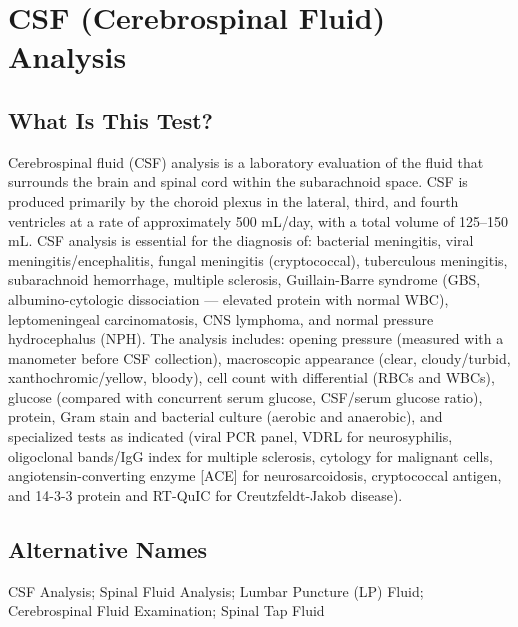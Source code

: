 \chapter{CSF (Cerebrospinal Fluid) Analysis}
\section*{What Is This Test?}
Cerebrospinal fluid (CSF) analysis is a laboratory evaluation of the fluid that surrounds the brain and spinal cord within the subarachnoid space. CSF is produced primarily by the choroid plexus in the lateral, third, and fourth ventricles at a rate of approximately 500 mL/day, with a total volume of 125--150 mL. CSF analysis is essential for the diagnosis of: bacterial meningitis, viral meningitis/encephalitis, fungal meningitis (cryptococcal), tuberculous meningitis, subarachnoid hemorrhage, multiple sclerosis, Guillain-Barre syndrome (GBS, albumino-cytologic dissociation --- elevated protein with normal WBC), leptomeningeal carcinomatosis, CNS lymphoma, and normal pressure hydrocephalus (NPH). The analysis includes: opening pressure (measured with a manometer before CSF collection), macroscopic appearance (clear, cloudy/turbid, xanthochromic/yellow, bloody), cell count with differential (RBCs and WBCs), glucose (compared with concurrent serum glucose, CSF/serum glucose ratio), protein, Gram stain and bacterial culture (aerobic and anaerobic), and specialized tests as indicated (viral PCR panel, VDRL for neurosyphilis, oligoclonal bands/IgG index for multiple sclerosis, cytology for malignant cells, angiotensin-converting enzyme [ACE] for neurosarcoidosis, cryptococcal antigen, and 14-3-3 protein and RT-QuIC for Creutzfeldt-Jakob disease).
\section*{Alternative Names}
CSF Analysis; Spinal Fluid Analysis; Lumbar Puncture (LP) Fluid; Cerebrospinal Fluid Examination; Spinal Tap Fluid

